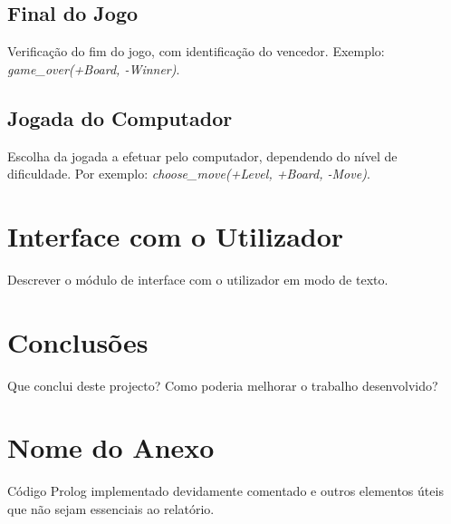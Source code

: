 \documentclass[a4paper]{article}
\begin{document}
\subsection{Final do Jogo} Verificação do fim do jogo, com identificação do vencedor. Exemplo: \textit{game\_over(+Board, -Winner)}.

\subsection{Jogada do Computador} Escolha da jogada a efetuar pelo computador, dependendo do nível de dificuldade. Por exemplo: \textit{choose\_move(+Level, +Board, -Move)}.


\section{Interface com o Utilizador}

Descrever o módulo de interface com o utilizador em modo de texto.


\section{Conclusões}
Que conclui deste projecto? Como poderia melhorar o trabalho desenvolvido?


\clearpage
{}
\renewcommand\refname{Bibliografia}



\newpage
\appendix
\section{Nome do Anexo}
Código Prolog implementado devidamente comentado e outros elementos úteis que não sejam essenciais ao relatório.
\end{document}
